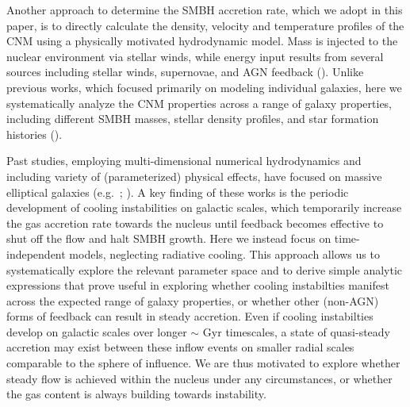 \documentclass[usenatbib,fleqn]{mn2e}
\begin{document}

Another approach to determine the SMBH accretion rate, which we adopt
in this paper, is to directly calculate the density, velocity and
temperature profiles of the CNM using a physically motivated
hydrodynamic model.  Mass is injected to the nuclear environment via
stellar winds, while energy input results from several sources
including stellar winds, supernovae, and AGN feedback
(\citealt{Quataert:2004a,De-ColleGuillochon+:2012a,ShcherbakovWong+:2014a}).
Unlike previous works, which focused primarily on modeling individual galaxies, here
we systematically analyze the CNM properties across a range of galaxy properties, including different SMBH masses, stellar density profiles, and
star formation histories (\citealt{WangMerritt:2004a}).

Past studies, employing multi-dimensional numerical hydrodynamics and
including variety of (parameterized) physical effects, have focused on
massive elliptical galaxies (e.g.~\citealt{Ciotti&Ostriker07};
\citealt{Ciotti+10}).  A key finding of these works is the periodic
development of cooling instabilities on galactic scales, which
temporarily increase the gas accretion rate towards the nucleus until
feedback becomes effective to shut off the flow and halt
SMBH growth.  Here we instead focus on time-independent models,
neglecting radiative cooling.  This approach allows us to
systematically explore the relevant parameter space and to derive
simple analytic expressions that prove useful in exploring whether
cooling instabilties manifest across the expected range of galaxy
properties, or whether other (non-AGN) forms of feedback can result in
steady accretion.  Even if cooling instabilties develop on galactic
scales over longer $\sim$ Gyr timescales, a state of
quasi-steady accretion may exist between these inflow events on
smaller radial scales comparable to the sphere of influence.  We are
thus motivated to explore whether steady flow is achieved within the
nucleus under any circumstances, or whether the gas content is always
building towards instability.
\end{document}

